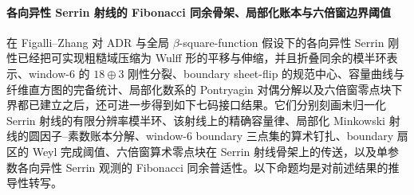 \paragraph{各向异性 Serrin 射线的 Fibonacci 同余骨架、局部化账本与六倍窗边界阈值}
在 Figalli--Zhang 对 ADR 与全局 \(\beta\)-square-function 假设下的各向异性 Serrin 刚性已经把可实现粗糙域压缩为 Wulff 形的平移与伸缩，并且折叠同余的模半环表示、window-\(6\) 的 \(18\oplus 3\) 刚性分裂、boundary sheet-flip 的规范中心、容量曲线与纤维直方图的完备统计、局部化数系的 Pontryagin 对偶分解以及六倍窗零点块下界都已建立之后，还可进一步得到如下七码接口结果。它们分别刻画未归一化 Serrin 射线的有限分辨率模半环、该射线上的精确容量律、局部化 Minkowski 射线的圆因子--素数账本分解、window-\(6\) boundary 三点集的算术钉扎、boundary 扇区的 Weyl 完成阈值、六倍窗算术零点块在 Serrin 射线骨架上的传送，以及单参数各向异性 Serrin 观测的 Fibonacci 同余普适性。以下命题均是对前述结果的推导性转写。 \cite{FigalliZhang2026AnisotropicSerrinGeneralDomains}


